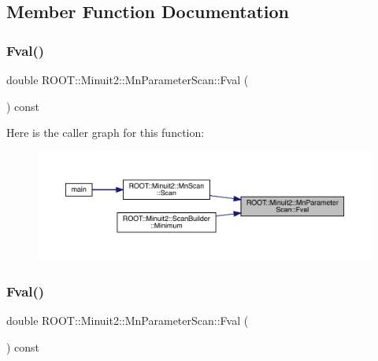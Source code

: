 \subsection{Member Function Documentation}
\mbox{\label{classROOT_1_1Minuit2_1_1MnParameterScan_a7251577562ac12179ea9669e9a10bac7}} 
\subsubsection{\texorpdfstring{Fval()}{Fval()}\hspace{0.1cm}{\footnotesize\ttfamily [1/2]}}
{\footnotesize\ttfamily double R\+O\+O\+T\+::\+Minuit2\+::\+Mn\+Parameter\+Scan\+::\+Fval (\begin{DoxyParamCaption}{ }\end{DoxyParamCaption}) const\hspace{0.3cm}{\ttfamily [inline]}}

Here is the caller graph for this function\+:\nopagebreak
\begin{figure}[H]
\begin{center}
\leavevmode
\includegraphics[width=350pt]{da/d9e/classROOT_1_1Minuit2_1_1MnParameterScan_a7251577562ac12179ea9669e9a10bac7_icgraph}
\end{center}
\end{figure}
\mbox{\label{classROOT_1_1Minuit2_1_1MnParameterScan_a7251577562ac12179ea9669e9a10bac7}} 
\subsubsection{\texorpdfstring{Fval()}{Fval()}\hspace{0.1cm}{\footnotesize\ttfamily [2/2]}}
{\footnotesize\ttfamily double R\+O\+O\+T\+::\+Minuit2\+::\+Mn\+Parameter\+Scan\+::\+Fval (\begin{DoxyParamCaption}{ }\end{DoxyParamCaption}) const\hspace{0.3cm}{\ttfamily [inline]}}

